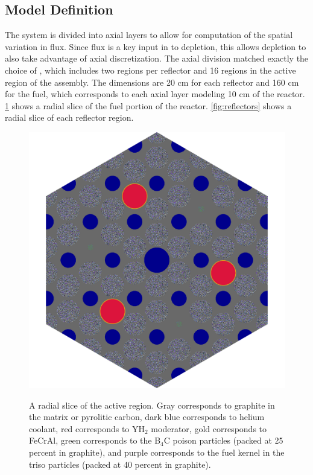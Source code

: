 \documentclass[letterpaper]{physor2024}
\begin{document}
\subsection{Model Definition}\label{sec:model_def}
The system is divided into axial layers to allow for computation of the spatial variation in flux. Since flux is a key input in to depletion, this allows depletion to also take advantage of axial discretization. The axial division matched exactly the choice of \cite{Abdelhameed-ANS-2022}, which includes two regions per reflector and 16 regions in the active region of the assembly. The dimensions are 20 cm for each reflector and 160 cm for the fuel, which corresponds to each axial layer modeling 10 cm of the reactor. \cref{fig:core_slice_sbs} shows a radial slice of the fuel portion of the reactor. \cref{fig:reflectors} shows a radial slice of each reflector region.
\begin{figure}[h!]
    \centering
    \includegraphics[width=0.7\linewidth]{figures/active_height.png}
    \label{fig:active_slice}
    \caption{A radial slice of the active region. Gray corresponds to graphite in the matrix or pyrolitic carbon, dark blue corresponds to helium coolant, red corresponds to YH$_{2}$ moderator, gold corresponds to FeCrAl, green corresponds to the B$_{4}$C poison particles (packed at 25 percent in graphite), and purple corresponds to the fuel kernel in the \gls{triso} particles (packed at 40 percent in graphite).}
    \label{fig:core_slice_sbs}
\end{figure}
\end{document}

